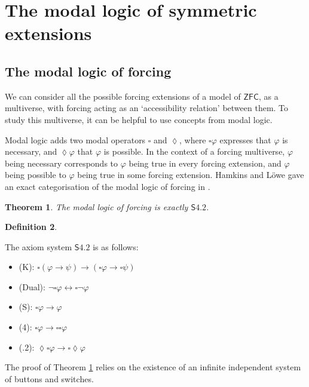 \documentclass[a4paper,11pt]{amsart}
\newtheorem{theorem}{Theorem}[section]
\theoremstyle{definition}
\newtheorem{definition}[theorem]{Definition}
\newcommand{\ZFC}{\mathsf{ZFC}}
\newcommand{\Sf}{\mathsf{S}4.2}
\begin{document}
\section{The modal logic of symmetric extensions}

\subsection{The modal logic of forcing}
We can consider all the possible forcing extensions of a model of $\ZFC$, as a multiverse, with forcing acting as an `accessibility relation' between them. To study this multiverse, it can be helpful to use concepts from modal logic.  

Modal logic adds two modal operators $\square$ and $\lozenge$, where $\square \varphi$ expresses that $\varphi$ is necessary, and $\lozenge \varphi$ that $\varphi$ is possible. In the context of a forcing multiverse, $\varphi$ being necessary corresponds to $\varphi$ being true in every forcing extension, and $\varphi$ being possible to $\varphi$ being true in some forcing extension. Hamkins and Löwe gave an exact categorisation of the modal logic of forcing in \cite{Hamkins-modal-logic}. 

\begin{theorem}\label{modal-forcing}
    The modal logic of forcing is exactly $\Sf$. 
\end{theorem}

\begin{definition}\label{s4.2:def}


The axiom system $\Sf$ is as follows: 
\begin{itemize}
        \item (K): $\square (\varphi \rightarrow \psi) \rightarrow (\square \varphi \rightarrow \square\psi)$
        \item (Dual): $\neg \square \varphi \leftrightarrow \square \neg \varphi $
        \item (S): $\square \varphi \rightarrow \varphi $
        \item (4): $\square \varphi \rightarrow \square \square \varphi $
        \item (.2): $\lozenge \square \varphi \rightarrow \square \lozenge \varphi $
\end{itemize}

\end{definition}

The proof of Theorem \ref{modal-forcing} relies on the existence of an infinite independent system of buttons and switches. 
\end{document}
